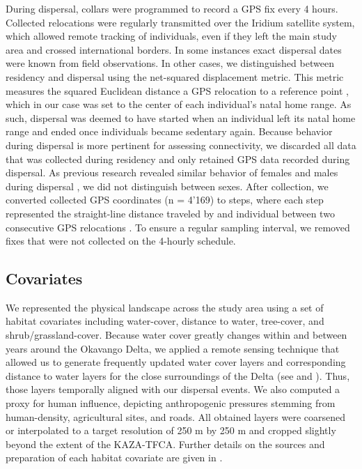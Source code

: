 \documentclass[abstract=on,10pt,a4paper,bibliography=totocnumbered]{article}
\begin{document}
During dispersal, collars were programmed to record a GPS fix every 4 hours.
Collected relocations were regularly transmitted over the Iridium satellite
system, which allowed remote tracking of individuals, even if they left the main
study area and crossed international borders. In some instances exact dispersal
dates were known from field observations. In other cases, we distinguished
between residency and dispersal using the net-squared displacement metric. This
metric measures the squared Euclidean distance a GPS relocation to a reference
point \citep{Borger.2012}, which in our case was set to the center of each
individual's natal home range. As such, dispersal was deemed to have started
when an individual left its natal home range and ended once individuals became
sedentary again. Because behavior during dispersal is more pertinent for
assessing connectivity, we discarded all data that was collected during
residency and only retained GPS data recorded during dispersal. As previous
research revealed similar behavior of females and males during dispersal
\citep{Woodroffe.2019, Cozzi.2020}, we did not distinguish between sexes. After
collection, we converted collected GPS coordinates (n = 4'169) to steps, where
each step represented the straight-line distance traveled by and individual
between two consecutive GPS relocations \citep{Turchin.1998}. To ensure a
regular sampling interval, we removed fixes that were not collected on the
4-hourly schedule.

\subsection{Covariates}
We represented the physical landscape across the study area using a set of
habitat covariates including water-cover, distance to water, tree-cover, and
shrub/grassland-cover. Because water cover greatly changes within and between
years around the Okavango Delta, we applied a remote sensing technique that
allowed us to generate frequently updated water cover layers and corresponding
distance to water layers for the close surroundings of the Delta (see
\citealp{Wolski.2017} and \citealp{Hofmann.2021}). Thus, those layers temporally
aligned with our dispersal events. We also computed a proxy for human influence,
depicting anthropogenic pressures stemming from human-density, agricultural
sites, and roads. All obtained layers were coarsened or interpolated to a target
resolution of 250 m by 250 m and cropped slightly beyond the extent of the
KAZA-TFCA. Further details on the sources and preparation of each habitat
covariate are given in \cite{Hofmann.2021}.
\end{document}
